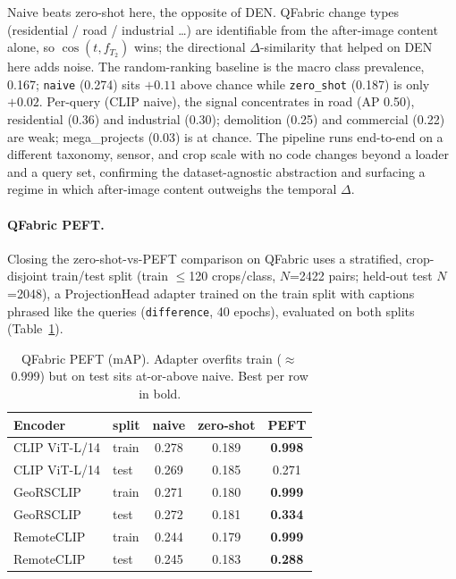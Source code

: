 \documentclass{article}
\begin{document}
Naive beats zero-shot here, the opposite of DEN. QFabric change types (residential
/ road / industrial \dots) are identifiable from the after-image content alone, so
$\cos(t, f_{T_2})$ wins; the directional $\Delta$-similarity that helped on DEN
here adds noise. The random-ranking baseline is the macro class prevalence, 0.167;
\texttt{naive} (0.274) sits $+0.11$ above chance while \texttt{zero\_shot} (0.187)
is only $+0.02$. Per-query (CLIP naive), the signal concentrates in road (AP
0.50), residential (0.36) and industrial (0.30); demolition (0.25) and commercial
(0.22) are weak; mega\_projects (0.03) is at chance. The pipeline runs end-to-end
on a different taxonomy, sensor, and crop scale with no code changes beyond a
loader and a query set, confirming the dataset-agnostic abstraction and surfacing
a regime in which after-image content outweighs the temporal $\Delta$.


\paragraph{QFabric PEFT.}
\label{sec:qfabricpeft}
Closing the zero-shot-vs-PEFT comparison on QFabric uses a stratified,
crop-disjoint train/test split (train $\leq$120 crops/class, $N$=2422 pairs;
held-out test $N$=2048), a ProjectionHead adapter trained on the train split with
captions phrased like the queries (\texttt{difference}, 40 epochs), evaluated on
both splits (Table~\ref{tab:qfabricpeft}).

\begin{table}[H]
    \centering
    \caption{QFabric PEFT (mAP). Adapter overfits train ($\approx$0.999) but on
    test sits at-or-above naive. Best per row in bold.}
    \label{tab:qfabricpeft}
    \begin{tabular}{llccc}
        \toprule
        \textbf{Encoder} & \textbf{split} & \textbf{naive} & \textbf{zero-shot} & \textbf{PEFT} \\
        \midrule
        CLIP ViT-L/14 & train & 0.278 & 0.189 & \textbf{0.998} \\
        CLIP ViT-L/14 & test  & 0.269 & 0.185 & 0.271 \\
        GeoRSCLIP     & train & 0.271 & 0.180 & \textbf{0.999} \\
        GeoRSCLIP     & test  & 0.272 & 0.181 & \textbf{0.334} \\
        RemoteCLIP    & train & 0.244 & 0.179 & \textbf{0.999} \\
        RemoteCLIP    & test  & 0.245 & 0.183 & \textbf{0.288} \\
        \bottomrule
    \end{tabular}
\end{table}
\end{document}
